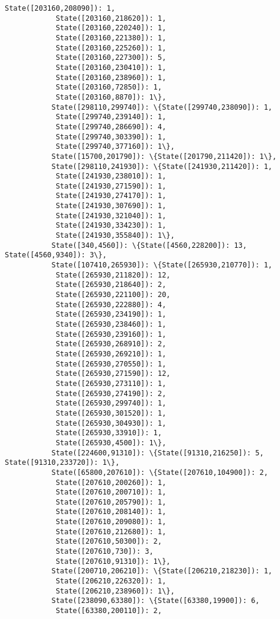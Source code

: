 \documentclass[11pt]{article}
\begin{document}
\begin{Verbatim}[commandchars=\\\{\}]
            State([203160,208090]): 1,
            State([203160,218620]): 1,
            State([203160,220240]): 1,
            State([203160,221380]): 1,
            State([203160,225260]): 1,
            State([203160,227300]): 5,
            State([203160,230410]): 1,
            State([203160,238960]): 1,
            State([203160,72850]): 1,
            State([203160,8870]): 1\},
           State([298110,299740]): \{State([299740,238090]): 1,
            State([299740,239140]): 1,
            State([299740,286690]): 4,
            State([299740,303390]): 1,
            State([299740,377160]): 1\},
           State([15700,201790]): \{State([201790,211420]): 1\},
           State([298110,241930]): \{State([241930,211420]): 1,
            State([241930,238010]): 1,
            State([241930,271590]): 1,
            State([241930,274170]): 1,
            State([241930,307690]): 1,
            State([241930,321040]): 1,
            State([241930,334230]): 1,
            State([241930,355840]): 1\},
           State([340,4560]): \{State([4560,228200]): 13, State([4560,9340]): 3\},
           State([107410,265930]): \{State([265930,210770]): 1,
            State([265930,211820]): 12,
            State([265930,218640]): 2,
            State([265930,221100]): 20,
            State([265930,222880]): 4,
            State([265930,234190]): 1,
            State([265930,238460]): 1,
            State([265930,239160]): 1,
            State([265930,268910]): 2,
            State([265930,269210]): 1,
            State([265930,270550]): 1,
            State([265930,271590]): 12,
            State([265930,273110]): 1,
            State([265930,274190]): 2,
            State([265930,299740]): 1,
            State([265930,301520]): 1,
            State([265930,304930]): 1,
            State([265930,33910]): 1,
            State([265930,4500]): 1\},
           State([224600,91310]): \{State([91310,216250]): 5, State([91310,233720]): 1\},
           State([65800,207610]): \{State([207610,104900]): 2,
            State([207610,200260]): 1,
            State([207610,200710]): 1,
            State([207610,205790]): 1,
            State([207610,208140]): 1,
            State([207610,209080]): 1,
            State([207610,212680]): 1,
            State([207610,50300]): 2,
            State([207610,730]): 3,
            State([207610,91310]): 1\},
           State([200710,206210]): \{State([206210,218230]): 1,
            State([206210,226320]): 1,
            State([206210,238960]): 1\},
           State([238090,63380]): \{State([63380,19900]): 6,
            State([63380,200110]): 2,

\end{Verbatim}
\end{document}
